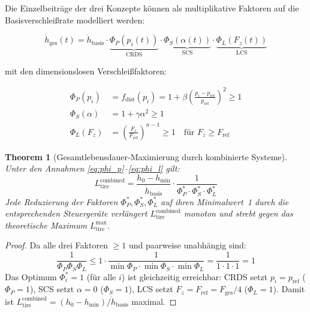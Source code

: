 ﻿\documentclass[12pt,a4paper]{article}
\newtheorem{theorem}{Theorem}[section]
\theoremstyle{definition}
\theoremstyle{remark}
\newcommand{\Ltire}{L_{\mathrm{tire}}}
\newcommand{\pref}{p_{\mathrm{ref}}}
\newcommand{\Fz}{F_z}
\begin{document}
Die Einzelbeiträge der drei Konzepte können als multiplikative Faktoren
auf die Basisverschleißrate modelliert werden:

\begin{equation}
  \dot{h}_{\mathrm{ges}}(t) = \dot{h}_{\mathrm{basis}} \cdot
    \underbrace{\Phi_P(p_i(t))}_{\text{CRDS}} \cdot
    \underbrace{\Phi_S(\alpha(t))}_{\text{SCS}} \cdot
    \underbrace{\Phi_L(\Fz(t))}_{\text{LCS}}
  \label{eq:total_wear}
\end{equation}

mit den dimensionslosen Verschleißfaktoren:

\begin{align}
  \Phi_P(p_i) &= f_{\mathrm{dist}}(p_i) = 1 + \beta\left(\frac{p_i - \pref}{\pref}\right)^2
                \geq 1 \label{eq:phi_p}\\
  \Phi_S(\alpha) &= 1 + \gamma \alpha^2 \geq 1 \label{eq:phi_s}\\
  \Phi_L(\Fz) &= \left(\frac{\Fz}{F_{\mathrm{ref}}}\right)^{n-1} \geq 1
    \quad\text{für } \Fz \geq F_{\mathrm{ref}} \label{eq:phi_l}
\end{align}

\begin{theorem}[Gesamtlebensdauer-Maximierung durch kombinierte Systeme]
\label{thm:combined}
Unter den Annahmen \eqref{eq:phi_p}--\eqref{eq:phi_l} gilt:
\begin{equation}
  \Ltire^{\mathrm{combined}} = \frac{h_0 - h_{\min}}{\dot{h}_{\mathrm{basis}}} \cdot
    \frac{1}{\Phi_P^* \cdot \Phi_S^* \cdot \Phi_L^*}
  \label{eq:life_combined}
\end{equation}
Jede Reduzierung der Faktoren $\Phi_P^*, \Phi_S^*, \Phi_L^*$ auf ihren
Minimalwert~1 durch die entsprechenden Steuergeräte verlängert $\Ltire^{\mathrm{combined}}$
monoton und strebt gegen das theoretische Maximum $\Ltire^{\max}$.
\end{theorem}

\begin{proof}
Da alle drei Faktoren $\geq 1$ und paarweise unabhängig sind:
\begin{equation}
  \frac{1}{\Phi_P \Phi_S \Phi_L} \leq 1 \cdot \frac{1}{\min \Phi_P \cdot \min \Phi_S \cdot \min \Phi_L}
    = \frac{1}{1 \cdot 1 \cdot 1} = 1
\end{equation}
Das Optimum $\Phi_i^* = 1$ (für alle $i$) ist gleichzeitig erreichbar:
CRDS setzt $p_i = \pref$ ($\Phi_P = 1$), SCS setzt $\alpha = 0$ ($\Phi_S = 1$),
LCS setzt $\Fz = F_{\mathrm{ref}} = F_{\mathrm{ges}}/4$ ($\Phi_L = 1$).
Damit ist $\Ltire^{\mathrm{combined}} = (h_0 - h_{\min}) / \dot{h}_{\mathrm{basis}}$
maximal.
\end{proof}
\end{document}
